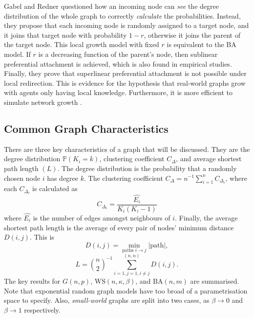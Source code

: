 Gabel and Redner \cite{RN60} questioned how an incoming node can \emph{see} the degree distribution of the whole graph to correctly \emph{calculate} the probabilities. Instead, they propose that each incoming node is randomly assigned to a target node, and it joins that target node with probability $1-r$, otherwise it joins the parent of the target node. This local growth model with fixed $r$ is equivalent to the BA model. If $r$ is a decreasing function of the parent's node, then sublinear preferential attachment is achieved, which is also found in empirical studies. Finally, they prove that superlinear preferential attachment is not possible under local redirection. This is evidence for the hypothesis that real-world graphs grow with agents only having local knowledge. Furthermore, it is more efficient to simulate network growth \cite{RN60}. 



\subsection{Common Graph Characteristics} \label{CGC}

There are three key characteristics of a graph that will be discussed. They are the degree distribution $\mathbb P(K_i = k)$, clustering coefficient $C_\Delta$, and average shortest path length $(L)$. The degree distribution is the probability that a randomly chosen node $i$ has degree $k$. The clustering coefficient $C_\Delta = n^{-1}\sum_{i=1}^n C_{\Delta_i}$, where each $C_{\Delta_i}$ is calculated as $$
 C_{\Delta_i} = \frac{\hat{E_i}}{K_i(K_i-1)}$$ where $\hat{E_i}$ is the number of edges amongst neighbours of $i$. Finally, the average shortest path length is the average of every pair of nodes' minimum distance $D(i,j)$. This is $$D(i,j) = \min_{\text{paths  } i \to j} |\text{path}|,$$ $$L = {n\choose 2} ^{-1}\sum_{i=1, j=1, i \neq j}^{(n,n)} D(i,j). $$ The key results for $G(n,p)$, $\mathrm{WS}(n,\kappa,\beta)$, and $\mathrm{BA}(n,m)$ are summarised. Note that exponential random graph models have too broad of a parametrisation space to specify. Also, \emph{small-world} graphs are split into two cases, as $\beta \to 0$ and $\beta \to 1$ respectively. 
 
